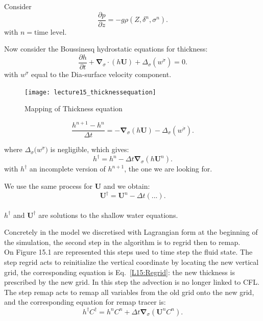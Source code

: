 Consider
\begin{equation}
    \frac{\partial p}{\partial z} =- g \rho (Z, \delta^n, \sigma^n).
\end{equation}
with $n = \text{time level}$.

Now consider the Boussinesq hydrostatic equations for thickness:
 \begin{equation}
     \frac{\partial h}{\partial t} + \boldsymbol{\nabla}_\sigma \cdot(h \boldsymbol{U})+\Delta_\sigma (w^{\dot{\sigma }})=0.
 \end{equation}
 with $w^{\dot{\sigma }}$ equal to the Dia-surface velocity component.
 \begin{figure}[h!]
  \centering
  \texttt{[image: lecture15\_thicknessequation]}
    \caption{Mapping of Thickness equation }
  \end{figure}

 \begin{equation}
     \frac{h^{n+1}-h^n}{\Delta t}= -\boldsymbol{\nabla}_\sigma(h\boldsymbol{U})- \Delta_\sigma (w^{\dot{\sigma }}).
 \end{equation}

 where ${\Delta_\sigma (w^{\dot{\sigma }}})$ is negligible, which gives:
  \begin{equation}
     h^\dagger=h^n-\Delta t \boldsymbol{\nabla}_\sigma(h\boldsymbol{U}^n)\label{L15:Regrid}.
 \end{equation}
 with $h^\dagger$ an incomplete version of $h^{n+1}$, the one we are looking for.
 
 We use the same process for $\boldsymbol{U}$ and we obtain:
 \begin{equation}
     \boldsymbol{U}^\dagger=\boldsymbol{U}^n-\Delta t (...).
 \end{equation}
 \\$h^\dagger$ and $\boldsymbol{U}^\dagger$ are  solutions to the shallow water equations.
 
 Concretely in the model we discretised with Lagrangian form at the beginning of the simulation, the second step in the algorithm is to regrid then to remap. 
 \\On Figure 15.1 are represented this steps used to time step the fluid state. The step regrid acts to reinitialize the vertical coordinate by locating the new vertical grid, the corresponding equation is Eq.~\eqref{L15:Regrid}: the new thickness is prescribed by the new grid. In this step the advection is no longer linked to CFL. The step remap acts to remap all variables from the old grid onto the new grid, and the corresponding equation for remap tracer is:
  \begin{equation}
     h^\dagger C^\dagger=h^nC^n+\Delta t \boldsymbol{\nabla}_\sigma(\boldsymbol{U}^nC^n)\label{L15:Remap}.
 \end{equation}
 
